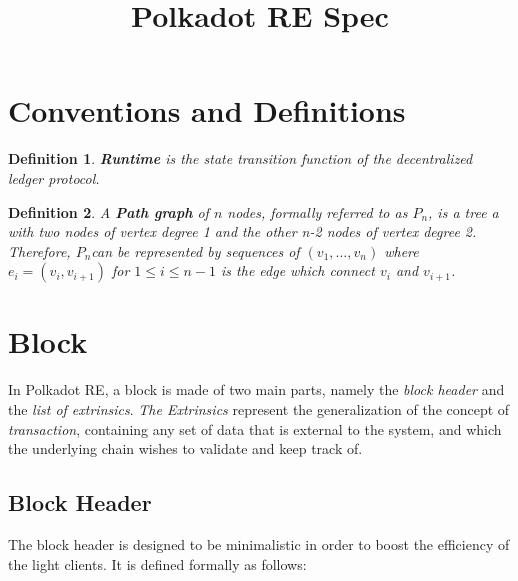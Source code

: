 \documentclass{article}
\newcommand{\tmem}[1]{{\em #1\/}}
\newcommand{\tmstrong}[1]{\textbf{#1}}
\newcommand{\tmtextit}[1]{{\itshape{#1}}}
\newtheorem{definition}{Definition}
\begin{document}
\title{Polkadot RE Spec}

\maketitle

\section{Conventions and Definitions}

\begin{definition}
  {\tmstrong{Runtime}} is the state transition function of the decentralized
  ledger protocol.
\end{definition}

\begin{definition}
  \label{def-path-graph}A {\tmstrong{Path graph}} of $n$ nodes, formally referred to as
  {\tmstrong{$P_n$}}, is a tree a with two nodes of vertex degree 1 and the
  other n-2 nodes of vertex degree 2. Therefore, $P_n $can be represented by
  sequences of $(v_1, \ldots, v_n)$ where $e_i = (v_i, v_{i + 1})$ for $1
  \leqslant i \leqslant n - 1$ is the edge which connect $v_i$ and $v_{i +
  1}$.
\end{definition}

\section{Block}

In Polkadot RE, a block is made of two main parts, namely the \tmtextit{block
header} and the \tmtextit{list of extrinsics}. {\tmem{The Extrinsics}}
represent the generalization of the concept of {\tmem{transaction}},
containing any set of data that is external to the system, and which the
underlying chain wishes to validate and keep track of.

\subsection{Block Header}\label{block_header}

The block header is designed to be minimalistic in order to boost the
efficiency of the light clients. It is defined formally as follows:
\end{document}
